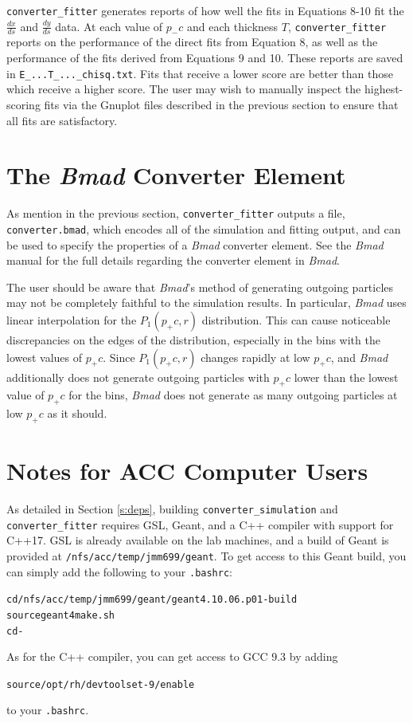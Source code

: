 \documentclass[12pt]{article}
\newcommand{\dxds}{\frac{dx}{ds}}
\newcommand{\dyds}{\frac{dy}{ds}}
\newcommand{\exes}{\texttt{converter\_simulation}\xspace}
\newcommand{\exef}{\texttt{converter\_fitter}\xspace}
\newcommand{\bmad}{\textit{Bmad}\xspace}
\newenvironment{example}
  {\vspace{-2.5ex} \begin{alltt}}
  {\end{alltt} \vspace{-2.2ex}}
\begin{document}
\exef generates reports of how well the fits in Equations 8-10 fit the $\dxds$ and $\dyds$ data.
At each value of $p_- c$ and each thickness $T$, \exef reports on the performance of the direct fits from Equation 8, as well as the performance of the fits derived from Equations 9 and 10.
These reports are saved in \texttt{E_...T_..._chisq.txt}.
Fits that receive a lower score are better than those which receive a higher score.
The user may wish to manually inspect the highest-scoring fits via the Gnuplot files described in the previous section to ensure that all fits are satisfactory.

\newpage
\section{The \bmad  Converter Element}

As mention in the previous section, \exef outputs a file, \texttt{converter.bmad}, which encodes all
of the simulation and fitting output, and can be used to specify the properties of a \bmad converter
element.  See the \bmad manual for the full details regarding the converter element in \bmad.

The user should be aware that \bmad's method of generating outgoing particles may not be completely
faithful to the simulation results.  In particular, \bmad uses linear interpolation for the
$P_1(p_+c, r)$ distribution.  This can cause noticeable discrepancies on the edges of the
distribution, especially in the bins with the lowest values of $p_+ c$.  Since $P_1(p_+c, r)$
changes rapidly at low $p_+ c$, and \bmad additionally does not generate outgoing particles with
$p_+ c$ lower than the lowest value of $p_+ c$ for the bins, \bmad does not generate as many
outgoing particles at low $p_+ c$ as it should.

\appendix

\newpage
\section{Notes for ACC Computer Users}

As detailed in Section \ref{s:deps}, building \exes and \exef requires GSL, Geant, and a C++
compiler with support for C++17.  GSL is already available on the lab machines, and a build of Geant
is provided at \texttt{/nfs/acc/temp/jmm699/geant}.  To get access to this Geant build, you can
simply add the following to your \texttt{.bashrc}:
\begin{example}
  cd /nfs/acc/temp/jmm699/geant/geant4.10.06.p01-build
  source geant4make.sh
  cd -
\end{example}
As for the C++ compiler, you can get access to GCC 9.3 by adding
\begin{example}
  source /opt/rh/devtoolset-9/enable
\end{example}
to your \texttt{.bashrc}.

\printbibliography
\end{document}

